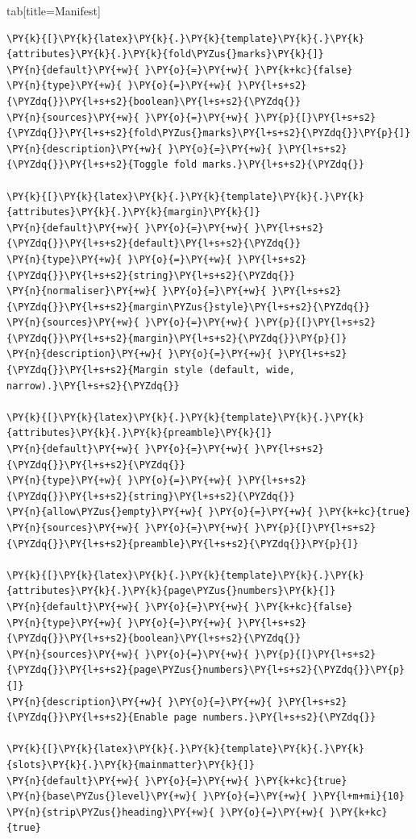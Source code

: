 \documentclass[a4paper,twoside]{article}
\begin{document}
\begin{tsdiv}{tab}[title=Manifest]
\begin{tscode}[lang=toml, engine=pygments]
\begin{Verbatim}[commandchars=\\\{\},breaklines, breakanywhere, commandchars=\\\{\}]
\PY{k}{[}\PY{k}{latex}\PY{k}{.}\PY{k}{template}\PY{k}{.}\PY{k}{attributes}\PY{k}{.}\PY{k}{fold\PYZus{}marks}\PY{k}{]}
\PY{n}{default}\PY{+w}{ }\PY{o}{=}\PY{+w}{ }\PY{k+kc}{false}
\PY{n}{type}\PY{+w}{ }\PY{o}{=}\PY{+w}{ }\PY{l+s+s2}{\PYZdq{}}\PY{l+s+s2}{boolean}\PY{l+s+s2}{\PYZdq{}}
\PY{n}{sources}\PY{+w}{ }\PY{o}{=}\PY{+w}{ }\PY{p}{[}\PY{l+s+s2}{\PYZdq{}}\PY{l+s+s2}{fold\PYZus{}marks}\PY{l+s+s2}{\PYZdq{}}\PY{p}{]}
\PY{n}{description}\PY{+w}{ }\PY{o}{=}\PY{+w}{ }\PY{l+s+s2}{\PYZdq{}}\PY{l+s+s2}{Toggle fold marks.}\PY{l+s+s2}{\PYZdq{}}

\PY{k}{[}\PY{k}{latex}\PY{k}{.}\PY{k}{template}\PY{k}{.}\PY{k}{attributes}\PY{k}{.}\PY{k}{margin}\PY{k}{]}
\PY{n}{default}\PY{+w}{ }\PY{o}{=}\PY{+w}{ }\PY{l+s+s2}{\PYZdq{}}\PY{l+s+s2}{default}\PY{l+s+s2}{\PYZdq{}}
\PY{n}{type}\PY{+w}{ }\PY{o}{=}\PY{+w}{ }\PY{l+s+s2}{\PYZdq{}}\PY{l+s+s2}{string}\PY{l+s+s2}{\PYZdq{}}
\PY{n}{normaliser}\PY{+w}{ }\PY{o}{=}\PY{+w}{ }\PY{l+s+s2}{\PYZdq{}}\PY{l+s+s2}{margin\PYZus{}style}\PY{l+s+s2}{\PYZdq{}}
\PY{n}{sources}\PY{+w}{ }\PY{o}{=}\PY{+w}{ }\PY{p}{[}\PY{l+s+s2}{\PYZdq{}}\PY{l+s+s2}{margin}\PY{l+s+s2}{\PYZdq{}}\PY{p}{]}
\PY{n}{description}\PY{+w}{ }\PY{o}{=}\PY{+w}{ }\PY{l+s+s2}{\PYZdq{}}\PY{l+s+s2}{Margin style (default, wide, narrow).}\PY{l+s+s2}{\PYZdq{}}

\PY{k}{[}\PY{k}{latex}\PY{k}{.}\PY{k}{template}\PY{k}{.}\PY{k}{attributes}\PY{k}{.}\PY{k}{preamble}\PY{k}{]}
\PY{n}{default}\PY{+w}{ }\PY{o}{=}\PY{+w}{ }\PY{l+s+s2}{\PYZdq{}}\PY{l+s+s2}{\PYZdq{}}
\PY{n}{type}\PY{+w}{ }\PY{o}{=}\PY{+w}{ }\PY{l+s+s2}{\PYZdq{}}\PY{l+s+s2}{string}\PY{l+s+s2}{\PYZdq{}}
\PY{n}{allow\PYZus{}empty}\PY{+w}{ }\PY{o}{=}\PY{+w}{ }\PY{k+kc}{true}
\PY{n}{sources}\PY{+w}{ }\PY{o}{=}\PY{+w}{ }\PY{p}{[}\PY{l+s+s2}{\PYZdq{}}\PY{l+s+s2}{preamble}\PY{l+s+s2}{\PYZdq{}}\PY{p}{]}

\PY{k}{[}\PY{k}{latex}\PY{k}{.}\PY{k}{template}\PY{k}{.}\PY{k}{attributes}\PY{k}{.}\PY{k}{page\PYZus{}numbers}\PY{k}{]}
\PY{n}{default}\PY{+w}{ }\PY{o}{=}\PY{+w}{ }\PY{k+kc}{false}
\PY{n}{type}\PY{+w}{ }\PY{o}{=}\PY{+w}{ }\PY{l+s+s2}{\PYZdq{}}\PY{l+s+s2}{boolean}\PY{l+s+s2}{\PYZdq{}}
\PY{n}{sources}\PY{+w}{ }\PY{o}{=}\PY{+w}{ }\PY{p}{[}\PY{l+s+s2}{\PYZdq{}}\PY{l+s+s2}{page\PYZus{}numbers}\PY{l+s+s2}{\PYZdq{}}\PY{p}{]}
\PY{n}{description}\PY{+w}{ }\PY{o}{=}\PY{+w}{ }\PY{l+s+s2}{\PYZdq{}}\PY{l+s+s2}{Enable page numbers.}\PY{l+s+s2}{\PYZdq{}}

\PY{k}{[}\PY{k}{latex}\PY{k}{.}\PY{k}{template}\PY{k}{.}\PY{k}{slots}\PY{k}{.}\PY{k}{mainmatter}\PY{k}{]}
\PY{n}{default}\PY{+w}{ }\PY{o}{=}\PY{+w}{ }\PY{k+kc}{true}
\PY{n}{base\PYZus{}level}\PY{+w}{ }\PY{o}{=}\PY{+w}{ }\PY{l+m+mi}{10}
\PY{n}{strip\PYZus{}heading}\PY{+w}{ }\PY{o}{=}\PY{+w}{ }\PY{k+kc}{true}


\end{Verbatim}
\end{tscode}
\end{tsdiv}
\end{document}
